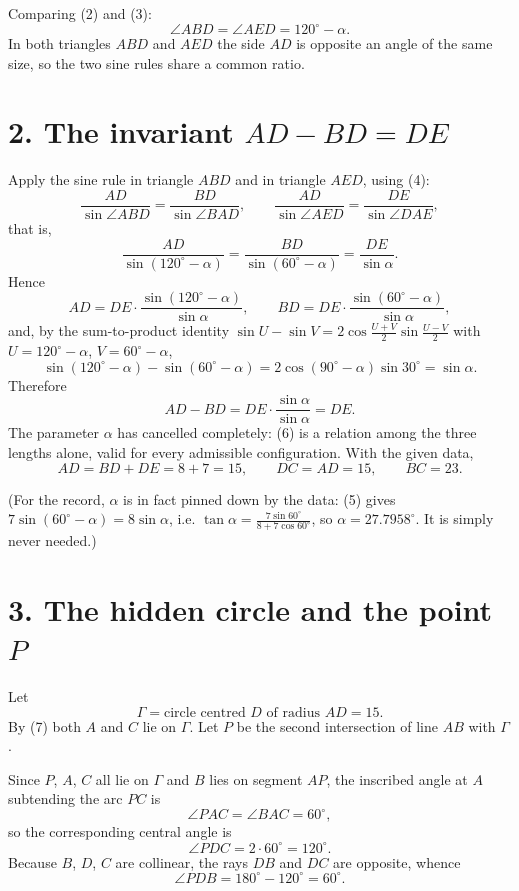 \documentclass[12pt]{article}
\newcommand{\ang}{^\circ}
\newcommand{\Gam}{\Gamma}
\begin{document}
Comparing (2) and (3):
\[
\boxed{\displaystyle \angle ABD=\angle AED=120\ang-\alpha .}
\tag{4}
\]
In both triangles \(ABD\) and
\(AED\) the side \(AD\) is opposite an angle of the same size, so the two
sine rules share a common ratio.

\section*{2. The invariant \(AD-BD=DE\)}

Apply the sine rule in triangle \(ABD\) and in triangle \(AED\), using
(4):
\[
\frac{AD}{\sin\angle ABD}=\frac{BD}{\sin\angle BAD},
\qquad
\frac{AD}{\sin\angle AED}=\frac{DE}{\sin\angle DAE},
\]
that is,
\[
\frac{AD}{\sin(120\ang-\alpha)}
=\frac{BD}{\sin(60\ang-\alpha)}
=\frac{DE}{\sin\alpha}.
\tag{5}
\]
Hence
\[
AD=DE\cdot\frac{\sin(120\ang-\alpha)}{\sin\alpha},
\qquad
BD=DE\cdot\frac{\sin(60\ang-\alpha)}{\sin\alpha},
\]
and, by the sum-to-product identity
\(\sin U-\sin V=2\cos\frac{U+V}{2}\sin\frac{U-V}{2}\) with
\(U=120\ang-\alpha\), \(V=60\ang-\alpha\),
\[
\sin(120\ang-\alpha)-\sin(60\ang-\alpha)
=2\cos(90\ang-\alpha)\sin 30\ang
=\sin\alpha .
\]
Therefore
\[
\boxed{\displaystyle
AD-BD=DE\cdot\frac{\sin\alpha}{\sin\alpha}=DE .}
\tag{6}
\]
The parameter \(\alpha\) has cancelled completely: (6) is a relation
among the three lengths alone, valid for every admissible configuration.
With the given data,
\[
AD=BD+DE=8+7=15,
\qquad DC=AD=15,\qquad BC=23 .
\tag{7}
\]

(For the record, \(\alpha\) is in fact pinned down by the data: (5) gives
\(7\sin(60\ang-\alpha)=8\sin\alpha\), i.e.
\(\tan\alpha=\frac{7\sin60\ang}{8+7\cos60\ang}\), so
\(\alpha=27.7958\ang\). It is simply never needed.)

\section*{3. The hidden circle and the point \(P\)}

Let
\[
\Gam=\text{circle centred }D\text{ of radius }AD=15 .
\]
By (7) both \(A\) and \(C\) lie on \(\Gam\). Let \(P\) be the second
intersection of line \(AB\) with \(\Gam\).

Since \(P\), \(A\), \(C\) all lie on \(\Gam\) and \(B\) lies on segment
\(AP\), the inscribed angle at \(A\) subtending the arc \(PC\) is
\[
\angle PAC=\angle BAC=60\ang ,
\]
so the corresponding central angle is
\[
\angle PDC=2\cdot60\ang=120\ang .
\tag{8}
\]
Because \(B\), \(D\), \(C\) are collinear, the rays \(DB\) and \(DC\) are
opposite, whence
\[
\angle PDB=180\ang-120\ang=60\ang .
\tag{9}
\]
\end{document}
